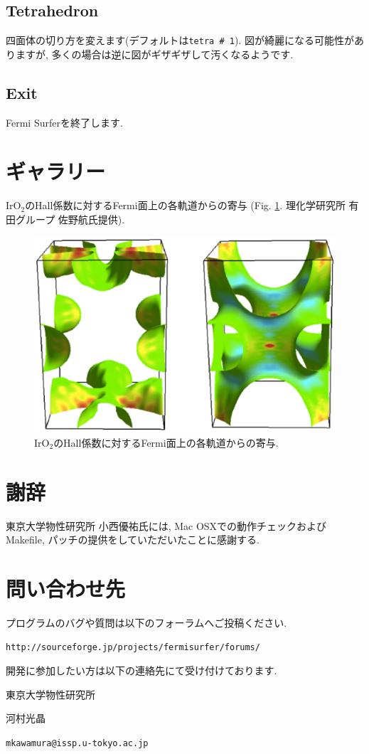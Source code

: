 \documentclass[12pt]{jarticle}
\begin{document}
\subsection{Tetrahedron}

四面体の切り方を変えます(デフォルトは\texttt{tetra \# 1}).
図が綺麗になる可能性がありますが, 
多くの場合は逆に図がギザギザして汚くなるようです. 

\subsection{Exit}

Fermi Surferを終了します. 

\section{ギャラリー}

IrO$_2$のHall係数に対するFermi面上の各軌道からの寄与
(Fig. \ref{fig_iro2}. 理化学研究所 有田グループ 佐野航氏提供). 

\begin{figure}[!ht]
  \includegraphics[width=17cm]{figs/iro2.eps}
  \caption{IrO$_2$のHall係数に対するFermi面上の各軌道からの寄与.}
  \label{fig_iro2}
\end{figure}

\section{謝辞}

東京大学物性研究所 小西優祐氏には, Mac OSXでの動作チェックおよびMakefile, 
パッチの提供をしていただいたことに感謝する.

\section{問い合わせ先}

プログラムのバグや質問は以下のフォーラムへご投稿ください.
\begin{verbatim}
http://sourceforge.jp/projects/fermisurfer/forums/
\end{verbatim}

開発に参加したい方は以下の連絡先にて受け付けております. 

東京大学物性研究所

河村光晶

\verb|mkawamura@issp.u-tokyo.ac.jp|
\end{document}
